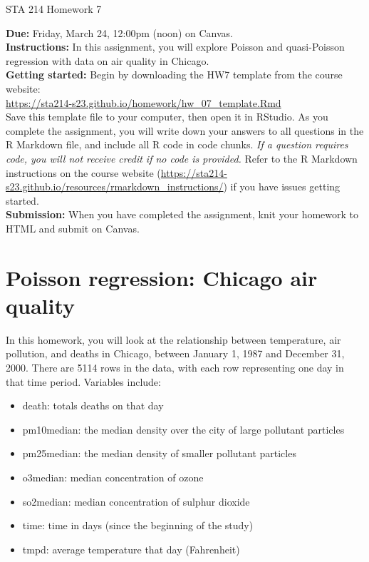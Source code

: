 \documentclass[11pt]{article}
\begin{document}
\begin{center}
\Large
STA 214 Homework 7\\
\normalsize
\vspace{5mm}
\end{center}

\noindent \textbf{Due:} Friday, March 24, 12:00pm (noon) on Canvas.\\ 

\noindent \textbf{Instructions:} In this assignment, you will explore Poisson and quasi-Poisson regression with data on air quality in Chicago.\\

\noindent \textbf{Getting started:} Begin by downloading the HW7 template from the course website:\\

\url{https://sta214-s23.github.io/homework/hw_07_template.Rmd}\\

\noindent Save this template file to your computer, then open it in RStudio. As you complete the assignment, you will write down your answers to all questions in the R Markdown file, and include all R code in code chunks. \textit{If a question requires code, you will not receive credit if no code is provided.} Refer to the R Markdown instructions on the course website (\url{https://sta214-s23.github.io/resources/rmarkdown_instructions/}) if you have issues getting started.\\

\noindent \textbf{Submission:} When you have completed the assignment, knit your homework to HTML and submit on Canvas. 

\section{Poisson regression: Chicago air quality}

In this homework, you will look at the relationship between temperature, air pollution, and deaths in Chicago, between January 1, 1987 and December 31, 2000. There are 5114 rows in the data, with each row representing one day in that time period. Variables include:

\begin{itemize}
\item death: totals deaths on that day
\item pm10median: the median density over the city of large pollutant particles
\item pm25median: the median density of smaller pollutant particles
\item o3median: median concentration of ozone
\item so2median: median concentration of sulphur dioxide
\item time: time in days (since the beginning of the study)
\item tmpd: average temperature that day (Fahrenheit)
\end{itemize}
\end{document}
